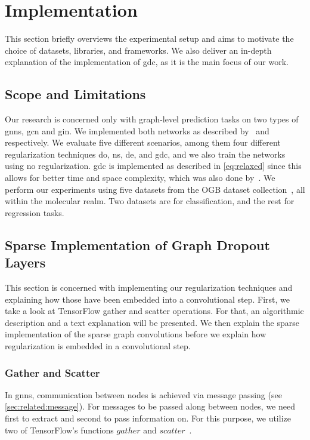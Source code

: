 \chapter{Implementation}
\label{sec:implement}
This section briefly overviews the experimental setup and aims to motivate the choice of datasets, libraries, and frameworks. We also deliver an in-depth explanation of the implementation of \ac{gdc}, as it is the main focus of our work.
\section{Scope and Limitations}
\label{sec:implement:scope}
Our research is concerned only with graph-level prediction tasks on two types of \acp{gnn}, \ac{gcn} and \ac{gin}.
We implemented both networks as described by~\citet{Kipf2017} and~\citet{Xu2019} respectively.
We evaluate five different scenarios, among them four different regularization techniques \ac{do}, \ac{ns}, \ac{de}, and \ac{gdc}, and we also train the networks using no regularization.
\Ac{gdc} is implemented as described in \cref{eq:relaxed} since this allows for better time and space complexity, which was also done by~\citet{Hasanzadeh2020}.
We perform our experiments using five datasets from the OGB dataset collection~\cite{Hu2020}, all within the molecular realm.
Two datasets are for classification, and the rest for regression tasks.

\section{Sparse Implementation of Graph Dropout Layers}

This section is concerned with implementing our regularization techniques and explaining how those have been embedded into a convolutional step. First, we take a look at TensorFlow gather and scatter operations. For that, an algorithmic description and a text explanation will be presented. We then explain the sparse implementation of the sparse graph convolutions before we explain how regularization is embedded in a convolutional step.
\label{sec:implement:gnndropout}
\subsection{Gather and Scatter}
\label{sec:implement:gnndropout:gatherscatter}
In \acp{gnn}, communication between nodes is achieved via message passing (see \cref{sec:related:message}).
For messages to be passed along between nodes, we need first to extract and second to pass information on.
For this purpose, we utilize two of TensorFlow's functions $\mathit{gather}$ and $\mathit{scatter}$~\cite{He2007,Damke2020}.

